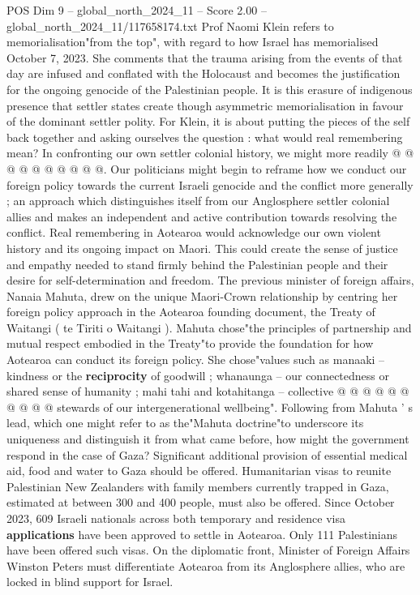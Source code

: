 \begin{textsample}{POS Dim 9 – global\_north\_2024\_11 – Score 2.00 – global\_north\_2024\_11/117658174.txt}
Prof Naomi Klein refers to memorialisation"from the top", with regard to how Israel has memorialised October 7, 2023.
She comments that the trauma arising from the events of that day are infused and conflated with the Holocaust and becomes the justification for the ongoing genocide of the Palestinian people.
It is this erasure of indigenous presence that settler states create though asymmetric memorialisation in favour of the dominant settler polity.
For Klein, it is about putting the pieces of the self back together and asking ourselves the question : what would real remembering mean?
In confronting our own settler colonial history, we might more readily @ @ @ @ @ @ @ @ @ @.
Our politicians might begin to reframe how we conduct our foreign policy towards the current Israeli genocide and the conflict more generally ; an approach which distinguishes itself from our Anglosphere settler colonial allies and makes an independent and active contribution towards resolving the conflict.
Real remembering in Aotearoa would acknowledge our own violent history and its ongoing impact on Maori.
This could create the sense of justice and empathy needed to stand firmly behind the Palestinian people and their desire for self-determination and freedom.
The previous minister of foreign affairs, Nanaia Mahuta, drew on the unique Maori-Crown relationship by centring her foreign policy approach in the Aotearoa founding document, the Treaty of Waitangi ( te Tiriti o Waitangi ).
Mahuta chose"the principles of partnership and mutual respect embodied in the Treaty"to provide the foundation for how Aotearoa can conduct its foreign policy.
She chose"values such as manaaki -- kindness or the \textbf{reciprocity} of goodwill ; whanaunga -- our connectedness or shared sense of humanity ; mahi tahi and kotahitanga -- collective @ @ @ @ @ @ @ @ @ @ stewards of our intergenerational wellbeing".
Following from Mahuta ' s lead, which one might refer to as the"Mahuta doctrine"to underscore its uniqueness and distinguish it from what came before, how might the government respond in the case of Gaza?
Significant additional provision of essential medical aid, food and water to Gaza should be offered.
Humanitarian visas to reunite Palestinian New Zealanders with family members currently trapped in Gaza, estimated at between 300 and 400 people, must also be offered.
Since October 2023, 609 Israeli nationals across both temporary and residence visa \textbf{applications} have been approved to settle in Aotearoa.
Only 111 Palestinians have been offered such visas.
On the diplomatic front, Minister of Foreign Affairs Winston Peters must differentiate Aotearoa from its Anglosphere allies, who are locked in blind support for Israel.

\end{textsample}
